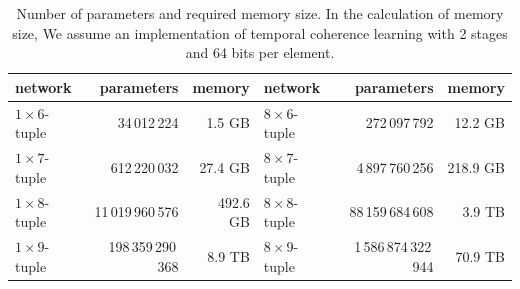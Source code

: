 \begin{table}
\setlength{\doublerulesep}{.4pt}
 \caption{Number of parameters and required memory size.  In the calculation of memory size, We assume an implementation of temporal coherence learning with 2 stages and 64 bits per element.}
\label{table:NTupleMemory}
 \centering\begin{tabular}{l|rr||l|rr}
\hline\hline
  network & parameters & memory & network & parameters & memory \\
\hline
  $1 \times 6$-tuple & 34\,012\,224 & 1.5 GB &  $8 \times 6$-tuple & 272\,097\,792 & 12.2 GB \\
  $1 \times 7$-tuple & 612\,220\,032 & 27.4 GB &  $8 \times 7$-tuple & 4\,897\,760\,256 & 218.9 GB \\
  $1 \times 8$-tuple & 11\,019\,960\,576 & 492.6 GB &  $8 \times 8$-tuple & 88\,159\,684\,608 & 3.9 TB \\
  $1 \times 9$-tuple & 198\,359\,290\,368 & 8.9 TB &  $8 \times 9$-tuple & 1\,586\,874\,322\,944 & 70.9 TB \\
\hline
 \end{tabular}
\end{table}


